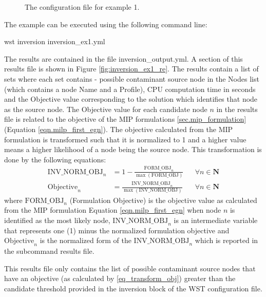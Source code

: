 \begin{figure}[!ht]
  \caption{The  configuration file for example 1.}
  \label{fig:inversion_ex1}
\end{figure}

The example can be executed using the following command line:
\begin{unknownListing}
wst inversion inversion_ex1.yml
\end{unknownListing}

The results are contained in the file {\outputprefix}inversion\_output.yml.
A section of this results file is shown in
Figure \ref{fig:inversion_ex1_re}. The results contain a list of sets
where each set contains - possible contaminant source node in the
Nodes list (which contains a node Name and a Profile), CPU
computation time in seconds and the Objective value corresponding
to the solution which identifies that node as the source node. The
Objective value for each candidate node $n$ in the results file is
related to the objective of the MIP
formulations \ref{sec.mip_formulation}
(Equation \ref{eqn.milp_first_egn}). The objective calculated from the
MIP formulation is transformed such that it is normalized to 1 and a
higher value means a higher likelihood of a node being the source
node. This transformation is done by the following equations:
\begin{align}
\textrm{INV\_NORM\_OBJ}_n &= 1 - \frac{\textrm{FORM\_OBJ}_n}{\max(\textrm{FORM\_OBJ})} &&\forall n \in \mathbf{N}\\
\textrm{Objective}_n &= \frac{\textrm{INV\_NORM\_OBJ}_n}{\max(\textrm{INV\_NORM\_OBJ})} &&\forall n \in \mathbf{N} \label{eq_transform_obj}
\end{align}
where $\textrm{FORM\_OBJ}_n$ (Formulation Objective) is the objective
value as calculated from the MIP formulation
Equation \ref{eqn.milp_first_egn} when node $n$ is identified as the
most likely node, $\textrm{INV\_NORM\_OBJ}_n$ is an intermediate
variable that represents one (1) minus the normalized formulation objective
and $\textrm{Objective}_n$ is the normalized form of the
$\textrm{INV\_NORM\_OBJ}_n$ which is reported in the 
subcommand results file.
   
This results file only contains the list
of possible contaminant source nodes that have an objective (as calculated by \ref{eq_transform_obj}) greater
than the candidate threshold provided in the inversion block of the WST configuration
file. 

